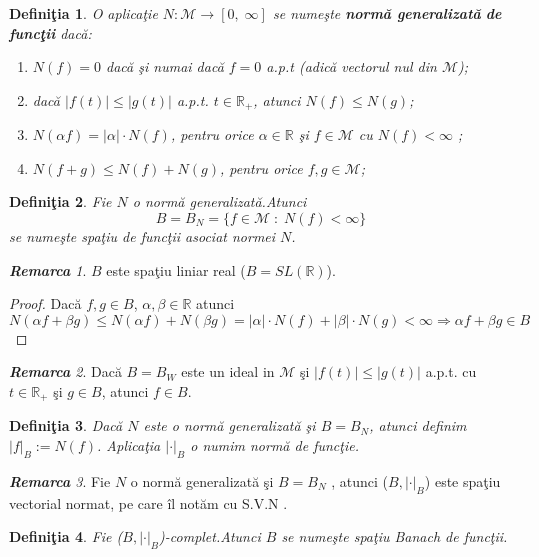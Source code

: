 \documentclass[ a4paper, 12pt]{report}
\newtheorem{definition}{\bf Defini\c tia}[section]
\theoremstyle{remark}
\newtheorem{remarc}{\bf Remarca}[section]
\numberwithin{equation}{section}
\begin{document}
\begin{definition}
O aplica\c tie $N : \mathcal{M} \rightarrow [0,\; \infty]$ se nume\c ste \textbf{norm\u a generalizat\u a} \textbf{de func\c tii} dac\u a:
\begin{enumerate}
\item $N(f)=0$ dac\u a \c si numai dac\u a $f=0$ a.p.t (adic\u a vectorul nul din $\mathcal{M}$);
\item dac\u a $ \lvert f(t) \rvert \leqslant \lvert g(t) \rvert$ a.p.t. $t\in \mathbb{R}_+$, atunci $N(f)\leqslant N(g)$;
\item $N(\alpha f)=\lvert \alpha \rvert \cdot N(f)$, pentru orice $\alpha\in \mathbb{R}$ \c si $f\in \mathcal{M}$ cu $N(f)<\infty$ ;
\item $N(f+g)\leqslant N(f)+N(g) $, pentru orice $f,g\in \mathcal{M}$;
\end{enumerate}
\end{definition}
\begin{definition}
Fie $N$ o norm\u a generalizat\u a.Atunci
$$B=B_N=\{f \in \mathcal{M}\; : \; N(f)<\infty\}$$ se nume\c ste \emph{spa\c tiu de func\c tii asociat normei} $N$.
\end{definition}
\begin{remarc}
$B$  este spa\c tiu liniar real ($B = SL(\mathbb{R})$).
\begin{proof}
Dac\u a $f,g\in B$, $\alpha,\beta \in \mathbb{R}$ atunci $N(\alpha f + \beta g)\leqslant N(\alpha f)+N(\beta g)=\lvert \alpha \rvert \cdot N(f)+\lvert \beta \rvert \cdot N(g)<\infty \Rightarrow \alpha f + \beta g \in B$
\end{proof}
\end{remarc}
\begin{remarc}
 Dac\u a $B=B_W$ este un ideal in $\mathcal{M}$  \c si $\lvert f(t) \rvert \leqslant \lvert g(t) \rvert$ a.p.t. cu $t \in \mathbb{R}_+$ \c si $g \in B$, atunci $f \in B$.
\end{remarc}
\begin{definition}
Dac\u a $N$ este o norm\u a generalizat\u a \c si $B=B_N$, atunci  definim $\lvert  f \rvert_B := N(f)$. Aplica\c tia $\lvert  \cdot  \rvert _B$ o numim norm\u a de func\c tie.
\end{definition}
\begin{remarc}
Fie $N$ o norm\u a generalizat\u a \c si $B=B_N$ , atunci ($B,\lvert \cdot \rvert_B$) este spa\c tiu vectorial normat, pe care \^il not\u am cu S.V.N .
\end{remarc}
\begin{definition}
Fie ($B,\lvert \cdot \rvert_B$)-complet.Atunci $B$ se nume\c ste spa\c tiu Banach de func\c tii.
\end{definition}
\end{document}
